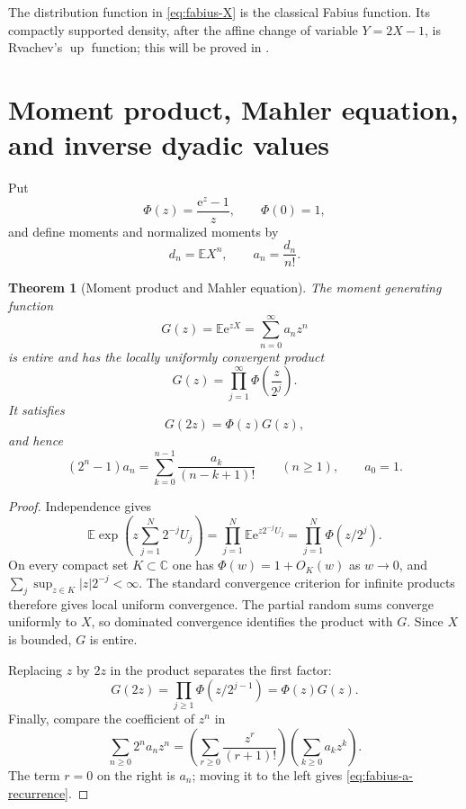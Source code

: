 \documentclass[11pt,oneside,openany]{book}
\newtheorem{theorem}{Theorem}[chapter]
\theoremstyle{definition}
\theoremstyle{remark}
\newcommand{\C}{\mathbb C}
\newcommand{\e}{\mathrm e}
\newcommand{\Expect}{\mathbb E}
\newcommand{\Up}{\operatorname{up}}
\begin{document}
The distribution function in \eqref{eq:fabius-X} is the classical Fabius
function.  Its compactly supported density, after the affine change of
variable $Y=2X-1$, is Rvachev's $\Up$ function; this will be proved in
.

\section{Moment product, Mahler equation, and inverse dyadic values}

Put
\begin{equation}\label{eq:fabius-Phi}
 \Phi(z)=\frac{\e^z-1}{z},\qquad \Phi(0)=1,
\end{equation}
and define moments and normalized moments by
\begin{equation}\label{eq:fabius-moments}
 d_n=\Expect X^n,
 \qquad
 a_n=\frac{d_n}{n!}.
\end{equation}

\begin{theorem}[Moment product and Mahler equation]\label{thm:fabius-moment-product}
The moment generating function
\begin{equation}\label{eq:fabius-G}
 G(z)=\Expect\e^{zX}=\sum_{n=0}^{\infty}a_nz^n
\end{equation}
is entire and has the locally uniformly convergent product
\begin{equation}\label{eq:fabius-G-product}
 G(z)=\prod_{j=1}^{\infty}\Phi\!\left(\frac z{2^j}\right).
\end{equation}
It satisfies
\begin{equation}\label{eq:fabius-G-Mahler}
 G(2z)=\Phi(z)G(z),
\end{equation}
and hence
\begin{equation}\label{eq:fabius-a-recurrence}
 (2^n-1)a_n
 =\sum_{k=0}^{n-1}\frac{a_k}{(n-k+1)!}
 \qquad(n\ge1),
 \qquad a_0=1.
\end{equation}
\end{theorem}

\begin{proof}
Independence gives
\[
 \Expect\exp\!\left(z\sum_{j=1}^N2^{-j}U_j\right)
 =\prod_{j=1}^N\Expect\e^{z2^{-j}U_j}
 =\prod_{j=1}^N\Phi(z/2^j).
\]
On every compact set $K\subset\C$ one has
$\Phi(w)=1+O_K(w)$ as $w\to0$, and
$\sum_j\sup_{z\in K}|z|2^{-j}<\infty$.  The standard convergence criterion
for infinite products therefore gives local uniform convergence.  The partial
random sums converge uniformly to $X$, so dominated convergence identifies
the product with $G$.  Since $X$ is bounded, $G$ is entire.

Replacing $z$ by $2z$ in the product separates the first factor:
\[
 G(2z)=\prod_{j\ge1}\Phi(z/2^{j-1})
      =\Phi(z)G(z).
\]
Finally, compare the coefficient of $z^n$ in
\[
 \sum_{n\ge0}2^na_nz^n
 =\left(\sum_{r\ge0}\frac{z^r}{(r+1)!}\right)
  \left(\sum_{k\ge0}a_kz^k\right).
\]
The term $r=0$ on the right is $a_n$; moving it to the left gives
\eqref{eq:fabius-a-recurrence}.
\end{proof}
\end{document}
